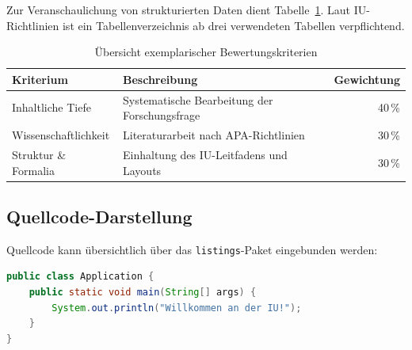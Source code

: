 Zur Veranschaulichung von strukturierten Daten dient Tabelle~\ref{tab:beispiel}. Laut IU-Richtlinien ist ein Tabellenverzeichnis ab drei verwendeten Tabellen verpflichtend.

\begin{table}[htbp]
    \centering
    \caption{Übersicht exemplarischer Bewertungskriterien}
    \label{tab:beispiel}
    \vspace{4pt}
    \begin{tabular}{llr}
        \hline
        \textbf{Kriterium} & \textbf{Beschreibung} & \textbf{Gewichtung} \\
        \hline
        Inhaltliche Tiefe & Systematische Bearbeitung der Forschungsfrage & 40\,\% \\
        Wissenschaftlichkeit & Literaturarbeit nach APA-Richtlinien & 30\,\% \\
        Struktur \& Formalia & Einhaltung des IU-Leitfadens und Layouts & 30\,\% \\
        \hline
    \end{tabular}
\end{table}

\subsection{Quellcode-Darstellung}
\label{subsec:code}

Quellcode kann übersichtlich über das \texttt{listings}-Paket eingebunden werden:

\begin{lstlisting}[language=Java, caption={Beispielhafte Java-Methode}, label={lst:java_beispiel}]
public class Application {
    public static void main(String[] args) {
        System.out.println("Willkommen an der IU!");
    }
}
\end{lstlisting}

\lipsum[7]
\lipsum[7-8]